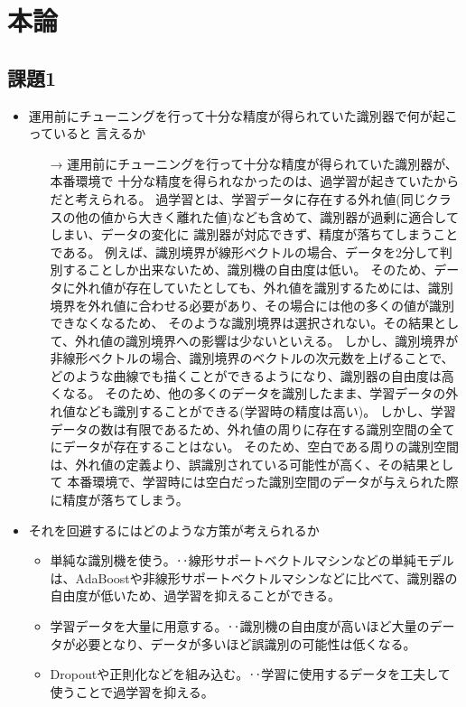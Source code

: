 \section{本論}
\subsection{課題1}
\begin{itemize}
  \item 運用前にチューニングを行って十分な精度が得られていた識別器で何が起こっていると
  言えるか
  \begin{itemize}
    \item[→] 運用前にチューニングを行って十分な精度が得られていた識別器が、本番環境で
    十分な精度を得られなかったのは、過学習が起きていたからだと考えられる。
    過学習とは、学習データに存在する外れ値(同じクラスの他の値から大きく離れた値)なども含めて、識別器が過剰に適合してしまい、データの変化に
    識別器が対応できず、精度が落ちてしまうことである。
    例えば、識別境界が線形ベクトルの場合、データを2分して判別することしか出来ないため、識別機の自由度は低い。
    そのため、データに外れ値が存在していたとしても、外れ値を識別するためには、識別境界を外れ値に合わせる必要があり、その場合には他の多くの値が識別できなくなるため、
    そのような識別境界は選択されない。その結果として、外れ値の識別境界への影響は少ないといえる。
    しかし、識別境界が非線形ベクトルの場合、識別境界のベクトルの次元数を上げることで、どのような曲線でも描くことができるようになり、識別器の自由度は高くなる。
    そのため、他の多くのデータを識別したまま、学習データの外れ値なども識別することができる(学習時の精度は高い)。
    しかし、学習データの数は有限であるため、外れ値の周りに存在する識別空間の全てにデータが存在することはない。
    そのため、空白である周りの識別空間は、外れ値の定義より、誤識別されている可能性が高く、その結果として
    本番環境で、学習時には空白だった識別空間のデータが与えられた際に精度が落ちてしまう。
  \end{itemize}
  \item それを回避するにはどのような方策が考えられるか
  \begin{itemize}
    \item 単純な識別機を使う。‥線形サポートベクトルマシンなどの単純モデルは、AdaBoostや非線形サポートベクトルマシンなどに比べて、識別器の自由度が低いため、過学習を抑えることができる。
    \item 学習データを大量に用意する。‥識別機の自由度が高いほど大量のデータが必要となり、データが多いほど誤識別の可能性は低くなる。
    \item Dropoutや正則化などを組み込む。‥学習に使用するデータを工夫して使うことで過学習を抑える。
  \end{itemize}
\end{itemize}

